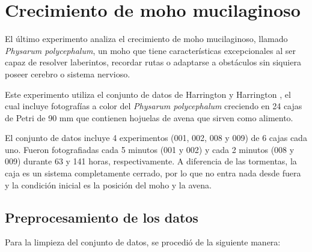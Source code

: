 \section{Crecimiento de moho mucilaginoso}

El último experimento analiza el crecimiento de moho mucilaginoso, llamado \textit{Physarum polycephalum}, un moho que tiene características excepcionales al ser capaz de resolver laberintos, recordar rutas o adaptarse a obstáculos sin siquiera poseer cerebro o sistema nervioso. 

Este experimento utiliza el conjunto de datos de Harrington y Harrington \cite{harrington2026physarum}, el cual incluye fotografías a color del \textit{Physarum polycephalum} creciendo en 24 cajas de Petri de 90 mm que contienen hojuelas de avena que sirven como alimento.  

El conjunto de datos incluye 4 experimentos (001, 002, 008 y 009) de 6 cajas cada uno. Fueron fotografiadas cada 5 minutos (001 y 002) y cada 2 minutos (008 y 009) durante 63 y 141 horas, respectivamente. A diferencia de las tormentas, la caja es un sistema completamente cerrado, por lo que no entra nada desde fuera y la condición inicial es la posición del moho y la avena.

\subsection{Preprocesamiento de los datos}

Para la limpieza del conjunto de datos, se procedió de la siguiente manera:

